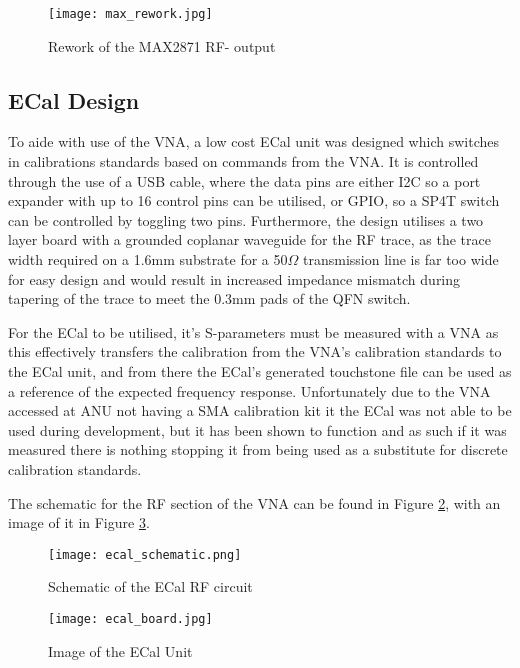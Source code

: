 \begin{figure}[H]
	\centering
	\texttt{[image: max\_rework.jpg]}
	\caption{Rework of the MAX2871 RF- output}
	\label{fig:max_rework}
\end{figure}

\subsection{ECal Design}
To aide with use of the VNA, a low cost ECal unit was designed which switches in calibrations standards based on commands from the VNA. It is controlled through the use of a USB cable, where the data pins are either I2C so a port expander with up to 16 control pins can be utilised, or GPIO, so a SP4T switch can be controlled by toggling two pins. Furthermore, the design utilises a two layer board with a grounded coplanar waveguide for the RF trace, as the trace width required on a 1.6mm substrate for a 50$\Omega$ transmission line is far too wide for easy design and would result in increased impedance mismatch during tapering of the trace to meet the 0.3mm pads of the QFN switch. 

For the ECal to be utilised, it's S-parameters must be measured with a VNA as this effectively transfers the calibration from the VNA's calibration standards to the ECal unit, and from there the ECal's generated touchstone file can be used as a reference of the expected frequency response. Unfortunately due to the VNA accessed at ANU not having a SMA calibration kit it the ECal was not able to be used during development, but it has been shown to function and as such if it was measured there is nothing stopping it from being used as a substitute for discrete calibration standards.

The schematic for the RF section of the VNA can be found in Figure \ref{fig:ecal_schematic}, with an image of it in Figure \ref{fig:ecal_photo}.

\begin{figure}[H]
	\centering
	\texttt{[image: ecal\_schematic.png]}
	\caption{Schematic of the ECal RF circuit}
	\label{fig:ecal_schematic}
\end{figure}

\begin{figure}[H]
	\centering
	\texttt{[image: ecal\_board.jpg]}
	\caption{Image of the ECal Unit}
	\label{fig:ecal_photo}
\end{figure}

